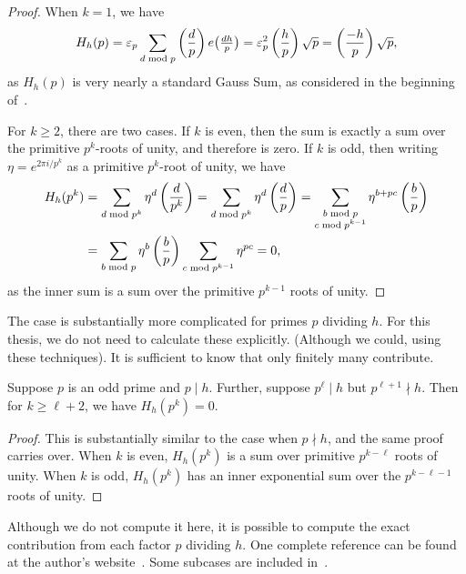 \begin{proof}
  When $k = 1$, we have
  \begin{equation}
    H_h(p) = \varepsilon_p \sum_{d \bmod p} \left(\frac{d}{p}\right) e \big( \tfrac{dh}{p} \big) =
    \varepsilon_p^2 \left(\frac{h}{p}\right) \sqrt p = \left(\frac{-h}{p}\right) \sqrt p,
  \end{equation}
  as $H_h(p)$ is very nearly a standard Gauss Sum, as considered in the beginning
  of~\cite{Davenport1980}.

  For $k \geq 2$, there are two cases.
  If $k$ is even, then the sum is exactly a sum over the primitive $p^k$-roots of unity,
  and therefore is zero.
  If $k$ is odd, then writing $\eta = e^{2\pi i / p^k}$ as a primitive $p^k$-root of
  unity, we have
  \begin{align}
    H_h(p^k) &= \sum_{d\bmod p^k} \eta^d \left(\frac{d}{p^k}\right) = \sum_{d\bmod p^k} \eta^d \left(\frac{d}{p}\right) =
    \sum_{\substack{b \bmod p \\ c \bmod p^{k-1}}} \eta^{b+pc} \left(\frac{b}{p}\right) \\
    &= \sum_{b\bmod p} \eta^b
    \left(\frac{b}{p}\right) \sum_{c\bmod p^{k-1}} \eta^{pc} = 0,
  \end{align}
  as the inner sum is a sum over the primitive $p^{k-1}$ roots of unity.
\end{proof}


The case is substantially more complicated for primes $p$ dividing $h$.
For this thesis, we do not need to calculate these explicitly.
(Although we could, using these techniques).
It is sufficient to know that only finitely many contribute.


\begin{lemma}\label{lem:back:Hh_badp_eval}
  Suppose $p$ is an odd prime and $p \mid h$.
  Further, suppose $p^\ell \mid h$ but $p^{\ell + 1} \nmid h$.
  Then for $k \geq \ell + 2$, we have $H_h(p^k) = 0$.
\end{lemma}


\begin{proof}

  This is substantially similar to the case when $p \nmid h$, and the same proof carries
  over.
  When $k$ is even, $H_h(p^k)$ is a sum over primitive $p^{k-\ell}$ roots of unity.
  When $k$ is odd, $H_h(p^k)$ has an inner exponential sum over the $p^{k - \ell - 1}$
  roots of unity.
%
\end{proof}


\begin{remark}
  Although we do not compute it here, it is possible to compute the exact contribution
  from each factor $p$ dividing $h$.
  One complete reference can be found at the author's website~\cite{mixedmathGauss}.
  Some subcases are included in~\cite{goldfeld1985eisenstein}.
\end{remark}



